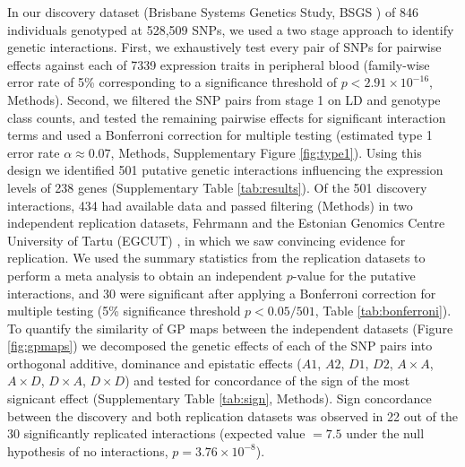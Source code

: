 \documentclass{article}
\begin{document}
In our discovery dataset (Brisbane Systems Genetics Study, BSGS \cite{Powell2012}) of 846 individuals genotyped at 528,509 SNPs, we used a two stage approach to identify genetic interactions. First, we exhaustively test every pair of SNPs for pairwise effects against each of 7339 expression traits in peripheral blood (family-wise error rate of 5\% corresponding to a significance threshold of $ p < 2.91 \times 10^{-16}$, Methods). Second, we filtered the SNP pairs from stage 1 on LD and genotype class counts, and tested the remaining pairwise effects for significant interaction terms and used a Bonferroni correction for multiple testing (estimated type 1 error rate $\alpha \approx 0.07$, Methods, Supplementary Figure \ref{fig:type1}). Using this design we identified 501 putative genetic interactions influencing the expression levels of 238 genes (Supplementary Table \ref{tab:results}). Of the 501 discovery interactions, 434 had available data and passed filtering (Methods) in two independent replication datasets, Fehrmann \cite{Fehrmann2011} and the Estonian Genomics Centre University of Tartu (EGCUT) \cite{Metspalu2004}, in which we saw convincing evidence for replication. We used the summary statistics from the replication datasets to perform a meta analysis to obtain an independent $p$-value for the putative interactions, and 30 were significant after applying a Bonferroni correction for multiple testing (5\% significance threshold $p < 0.05/501$, Table \ref{tab:bonferroni}). To quantify the similarity of GP maps between the independent datasets (Figure \ref{fig:gpmaps}) we decomposed the genetic effects of each of the SNP pairs into orthogonal additive, dominance and epistatic effects ($A1$, $A2$, $D1$, $D2$, $A \times A$, $A \times D$, $D \times A$, $D \times D$) and tested for concordance of the sign of the most signicant effect (Supplementary Table \ref{tab:sign}, Methods). Sign concordance between the discovery and both replication datasets was observed in 22 out of the 30 significantly replicated interactions (expected value $= 7.5$ under the null hypothesis of no interactions, $p = 3.76 \times 10^{-8}$).
\end{document}
